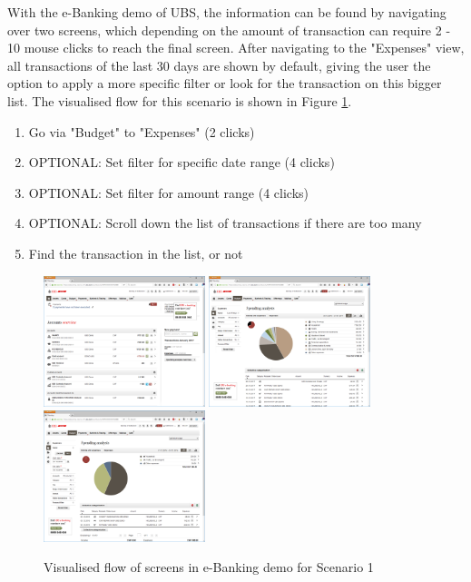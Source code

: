 With the e-Banking demo of UBS, the information can be found by navigating over two screens, which depending on the amount of transaction can require 2 - 10 mouse clicks to reach the final screen. After navigating to the "Expenses" view, all transactions of the last 30 days are shown by default, giving the user the option to apply a more specific filter or look for the transaction on this bigger list. The visualised flow for this scenario is shown in Figure \ref{fig:scenariooneebanking}.
\begin{enumerate}
	\item Go via "Budget" to "Expenses" (2 clicks)
	\item OPTIONAL: Set filter for specific date range (4 clicks)
	\item OPTIONAL: Set filter for amount range (4 clicks)
	\item OPTIONAL: Scroll down the list of transactions if there are too many
	\item Find the transaction in the list, or not
\end{enumerate}
\begin{figure}[h]
	\begin{center}
		\includegraphics[width=4.7cm]{03_Figures/09_Evaluation/UBS_1_Overview.png}
		\includegraphics[width=4.7cm]{03_Figures/09_Evaluation/UBS_2_SpendingAnalysis.png}
		\includegraphics[width=4.7cm]{03_Figures/09_Evaluation/UBS_2_SpendingAnalysis_Filter.png}
		\caption{Visualised flow of screens in e-Banking demo for Scenario 1}
		\label{fig:scenariooneebanking}
	\end{center}
\end{figure}


